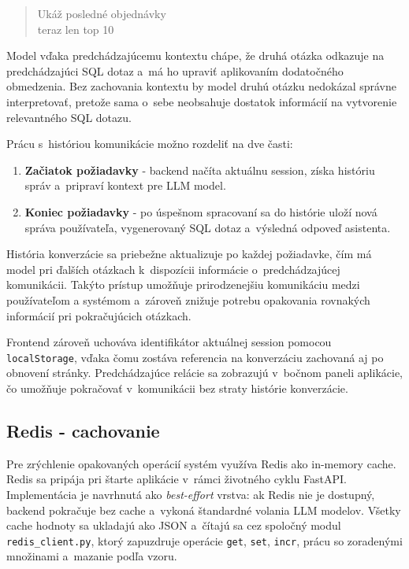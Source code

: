 \documentclass[a4paper, 12pt]{article}
\begin{document}
\begin{quote}
Ukáž posledné objednávky \\
teraz len top 10
\end{quote}

Model vďaka predchádzajúcemu kontextu chápe, že druhá otázka odkazuje na predchádzajúci SQL dotaz a~má ho upraviť aplikovaním dodatočného obmedzenia. Bez zachovania kontextu by model druhú otázku nedokázal správne interpretovať, pretože sama o~sebe neobsahuje dostatok informácií na vytvorenie relevantného SQL dotazu.

Prácu s~históriou komunikácie možno rozdeliť na dve časti:

\begin{enumerate}
    \item \textbf{Začiatok požiadavky} - backend načíta aktuálnu session, získa históriu správ a~pripraví kontext pre LLM model.
    \item \textbf{Koniec požiadavky} - po úspešnom spracovaní sa do histórie uloží nová správa používateľa, vygenerovaný SQL dotaz a~výsledná odpoveď asistenta.
\end{enumerate}

História konverzácie sa priebežne aktualizuje po každej požiadavke, čím má model pri ďalších otázkach k~dispozícii informácie o~predchádzajúcej komunikácii. Takýto prístup umožňuje prirodzenejšiu komunikáciu medzi používateľom a systémom a~zároveň znižuje potrebu opakovania rovnakých informácií pri pokračujúcich otázkach.

Frontend zároveň uchováva identifikátor aktuálnej session pomocou \texttt{localStorage}, vďaka čomu zostáva referencia na konverzáciu zachovaná aj po obnovení stránky. Predchádzajúce relácie sa zobrazujú v~bočnom paneli aplikácie, čo umožňuje pokračovať v~komunikácii bez straty histórie konverzácie.


\subsection{Redis - cachovanie}

Pre zrýchlenie opakovaných operácií systém využíva Redis ako in-memory cache. Redis sa pripája pri štarte aplikácie v~rámci životného cyklu FastAPI. Implementácia je navrhnutá ako \textit{best-effort} vrstva: ak Redis nie je dostupný, backend pokračuje bez cache a~vykoná štandardné volania  LLM modelov. Všetky cache hodnoty sa ukladajú ako JSON a~čítajú sa cez spoločný modul \texttt{redis\_client.py}, ktorý zapuzdruje operácie \texttt{get}, \texttt{set}, \texttt{incr}, prácu so zoradenými množinami a~mazanie podľa vzoru.
\end{document}
